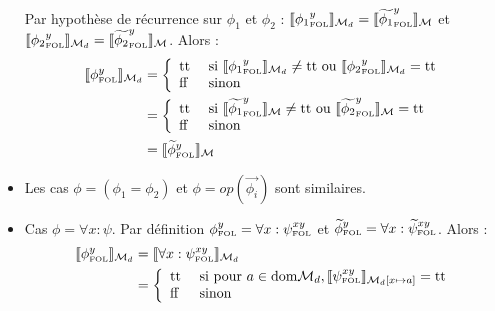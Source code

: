 \documentclass[12pt]{article}
\newcommand{\FOL}{\ensuremath{\textup{\tiny{}FOL}}}
\newcommand{\false}{\textup{ff}}
\newcommand{\true}{\textup{tt}}
\newcommand{\M}{\ensuremath{\mathcal{M}}}
\begin{document}
\begin{itemize}
  Par hypothèse de récurrence sur $\phi_1$ et $\phi_2$ : $\llbracket {\phi_1}_\FOL^y \rrbracket_{\M_d} = \llbracket {\widetilde{\phi_1}}_\FOL^y \rrbracket_{\M}$ et $\llbracket {\phi_2}_\FOL^y \rrbracket_{\M_d} = \llbracket {\widetilde{\phi_2}}_\FOL^y \rrbracket_{\M}$.
  Alors : 
  \begin{align*}
    \llbracket \phi_\FOL^y \rrbracket_{\M_d}
    &= \left \{
      \begin{array}{l l}
        \true & \textup{ si }  \llbracket {\phi_1}_\FOL^y \rrbracket_{\mathcal{M}_d} \neq \true \textup{ ou } \llbracket {\phi_2}_\FOL^y \rrbracket_{\mathcal{M}_d} = \true \\
        \false & \textup{ sinon }
      \end{array}
             \right . \\
    &= \left \{
      \begin{array}{l l}
        \true & \textup{ si }  \llbracket {\widetilde{\phi_1}}_\FOL^y \rrbracket_{\mathcal{M}} \neq \true \textup{ ou } \llbracket {\widetilde{\phi_2}}_\FOL^y \rrbracket_{\mathcal{M}} = \true \\
        \false & \textup{ sinon }
      \end{array}
             \right . \\
    &= \llbracket {\widetilde{\phi}}_\FOL^y \rrbracket_{\mathcal{M}}
  \end{align*}
\item
  Les cas $\phi = (\phi_1 = \phi_2)$ et $\phi = op(\vec{\phi_i})$ sont similaires.
\item
  Cas $\phi = \forall x : \psi$.
  Par définition $\phi_\FOL^y = \forall x : {\psi}_\FOL^{xy}$ et $\widetilde{\phi}_\FOL^y = \forall x : \widetilde{\psi}_\FOL^{xy}$.
  Alors :
  \begin{align*}
    \llbracket \phi_\FOL^y \rrbracket_{\mathcal{M}_d}
    &= \llbracket \forall x : \psi_\FOL^{xy} \rrbracket_{\mathcal{M}_d} \\
    &= \left \{
      \begin{array}{l l}
        \true & \textup{ si pour } a \in \textup{dom} \mathcal{M}_d, \llbracket \psi_\FOL^{xy} \rrbracket_{\mathcal{M}_d[x \mapsto a]} = \true \\
        \false & \textup{ sinon }
      \end{array}
                 \right . \\

\end{align*}
\end{itemize}
\end{document}
